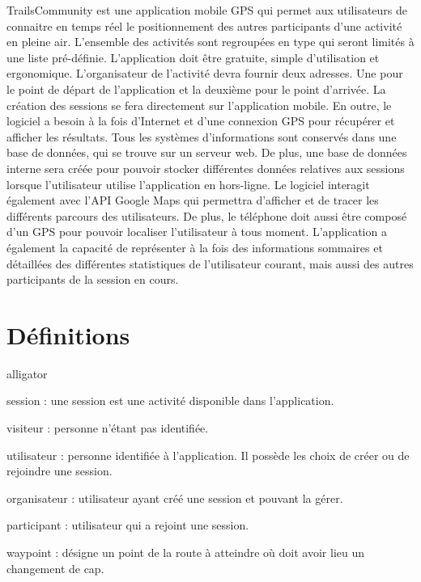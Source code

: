 \documentclass[titlepage, 12pt]{report}
\begin{document}
TrailsCommunity est une application mobile GPS qui permet aux utilisateurs de connaitre en temps réel le positionnement des autres participants d'une activité en pleine air. L'ensemble des activités sont regroupées en type qui seront limités à une liste pré-définie.
L'application doit être gratuite, simple d'utilisation et ergonomique.
L'organisateur de l'activité devra fournir deux adresses. Une pour le point de départ de l'application et la deuxième pour le point d'arrivée. La création des sessions se fera directement sur l'application mobile.
En outre, le logiciel a besoin à la fois d'Internet et d'une connexion GPS pour récupérer et afficher les résultats. Tous les systèmes d'informations sont conservés dans une base de données, qui se trouve sur un serveur web. De plus, une base de données interne sera créée pour pouvoir stocker différentes données relatives aux sessions lorsque l'utilisateur utilise l'application en hors-ligne.
Le logiciel interagit également avec l'API Google Maps qui permettra d'afficher et de tracer les différents parcours des utilisateurs. De plus, le téléphone doit aussi être composé d'un GPS pour pouvoir localiser l'utilisateur à tous moment. 
L'application a également la capacité de représenter à la fois des informations sommaires et détaillées des différentes statistiques de l'utilisateur courant, mais aussi des autres participants de la session en cours.

\section{Définitions}
\begin{labeling}{alligator}
	\item [session] : une session est une activité disponible dans l’application.
	\item [visiteur] : personne n’étant pas identifiée.
	\item [utilisateur] : personne identifiée à l’application. Il possède les choix de créer ou de rejoindre une session.
	\item [organisateur] : utilisateur ayant créé une session et pouvant la gérer.
	\item [participant] : utilisateur qui a rejoint une session.
	\item [waypoint] : désigne un point de la route à atteindre où doit avoir lieu un changement de cap.
\end{labeling}
\end{document}
